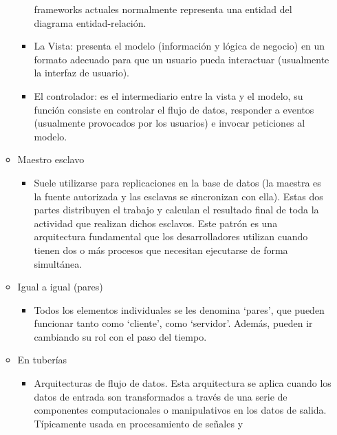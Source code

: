 \documentclass[12pt, twoside, openright]{report} %
\begin{document}
\begin{itemize}
\begin{itemize}
\begin{itemize}
			                  frameworks actuales normalmente representa una entidad del
			                  diagrama entidad-relación.
			            \item La Vista: presenta el modelo (información y lógica de negocio)
			                  en un formato adecuado para que un usuario pueda interactuar
			                  (usualmente la interfaz de usuario).
			            \item El controlador: es el intermediario entre la vista y el modelo,
			                  su función consiste en controlar el flujo de datos, responder a
			                  eventos (usualmente provocados por los usuarios) e invocar
			                  peticiones al modelo.
		            \end{itemize}
		      \item Maestro esclavo
		            \begin{itemize}
			            \item Suele utilizarse para replicaciones en la base de datos (la
			                  maestra es la fuente autorizada y las esclavas se sincronizan
			                  con ella). Estas dos partes distribuyen el trabajo y calculan el
			                  resultado final de toda la actividad que realizan dichos
			                  esclavos. Este patrón es una arquitectura fundamental que los
			                  desarrolladores utilizan cuando tienen dos o más procesos que
			                  necesitan ejecutarse de forma simultánea.
		            \end{itemize}
		      \item Igual a igual (pares)
		            \begin{itemize}
			            \item Todos los elementos individuales se les denomina `pares', que
			                  pueden funcionar tanto como `cliente', como `servidor'. Además,
			                  pueden ir cambiando su rol con el paso del tiempo.
		            \end{itemize}
		      \item En tuberías
		            \begin{itemize}
			            \item Arquitecturas de flujo de datos. Esta arquitectura se aplica
			                  cuando los datos de entrada son transformados a través de una
			                  serie de componentes computacionales o manipulativos en los
			                  datos de salida. Típicamente usada en procesamiento de señales y

\end{itemize}
\end{itemize}
\end{itemize}
\end{document}
